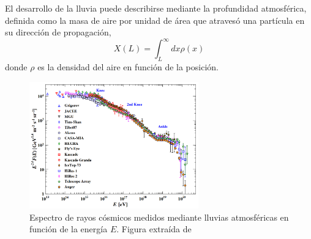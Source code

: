 El desarrollo de la lluvia puede describirse mediante la profundidad atmosférica, definida como la masa de aire por unidad de área que atravesó una partícula en su dirección de propagación, 
\begin{equation}
	X(L)= \int_L^\infty dx \rho(x)
\end{equation}
donde $\rho$ es la densidad del aire en función de la posición.

\begin{figure}[H]
	\centering
	\includegraphics[width=0.65\textwidth]{auger_spectrum.png}
	\caption{Espectro de rayos cósmicos medidos mediante lluvias atmosféricas en función de la energía $E$. Figura extraída de \cite{PGD}}
	\label{fig:spectra}
\end{figure}